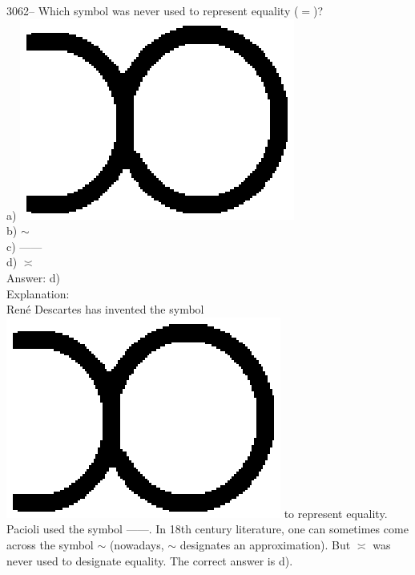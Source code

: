 \documentclass[letterpaper, 12pt]{article}
\begin{document}
3062-- Which symbol was never used to represent equality ($=$)?\\

a) \includegraphics[scale=0.09]{egaliteDescartes.eps}\\
b) $\sim$\\
c) ------\\
d) $\asymp$\\

Answer: d)\\

Explanation:\\
Ren\'e Descartes has invented the symbol \includegraphics[scale=0.09]{egaliteDescartes.eps} to represent equality. Pacioli used the symbol ------. In 18th century literature, one can sometimes come across the symbol $\sim$ (nowadays, $\sim$ designates an approximation). But $\asymp$ was never used to designate equality. The correct answer is d).\\
\end{document}
